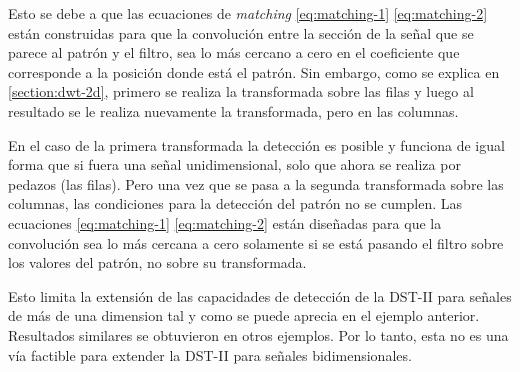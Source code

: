 Esto se debe a que las ecuaciones de \textit{matching} \ref{eq:matching-1} \ref{eq:matching-2} están 
construidas para que la convolución entre la sección de la señal que se parece al patrón y 
el filtro, sea lo más cercano a cero en el coeficiente que corresponde a la posición donde está el patrón.
Sin embargo, como se explica en \ref{section:dwt-2d}, primero se realiza la transformada sobre las filas y 
luego al resultado
se le realiza nuevamente la transformada, pero en las columnas. 

En el caso de la primera transformada la detección es posible y funciona de igual forma que si fuera una señal
unidimensional, solo que ahora se realiza por pedazos (las filas). 
Pero una vez que se pasa a la segunda transformada sobre las columnas, las condiciones para la detección del patrón no se cumplen.
Las ecuaciones \ref{eq:matching-1} \ref{eq:matching-2} están diseñadas para que la convolución sea lo más cercana 
a cero solamente si se está pasando el filtro sobre los valores del patrón, no sobre su transformada.

Esto limita la extensión de las capacidades de detección de la DST-II para señales de más de una dimension tal y como se puede
aprecia en el ejemplo anterior. Resultados similares se obtuvieron en otros ejemplos. Por lo tanto, esta no es una 
vía factible para extender la DST-II para señales bidimensionales.


